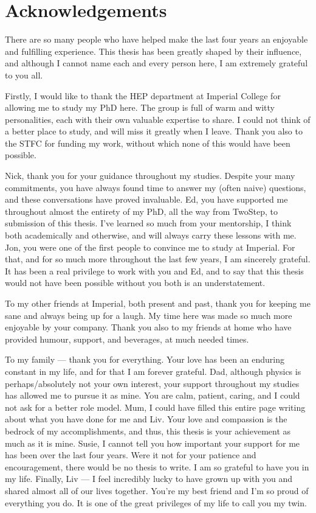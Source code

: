 \chapter*{\centering Acknowledgements}


There are so many people who have helped make the last four years an enjoyable and fulfilling experience. This thesis has been greatly shaped by their influence, and although I cannot name each and every person here, I am extremely grateful to you all.

Firstly, I would like to thank the HEP department at Imperial College for allowing me to study my PhD here. The group is full of warm and witty personalities, each with their own valuable expertise to share. I could not think of a better place to study, and will miss it greatly when I leave. Thank you also to the STFC for funding my work, without which none of this would have been possible.

Nick, thank you for your guidance throughout my studies. Despite your many commitments, you have always found time to answer my (often naive) questions, and these conversations have proved invaluable. 
Ed, you have supported me throughout almost the entirety of my PhD, all the way from TwoStep, to submission of this thesis. I've learned so much from your mentorship, I think both academically and otherwise, and will always carry these lessons with me. 
Jon, you were one of the first people to convince me to study at Imperial. For that, and for so much more throughout the last few years, I am sincerely grateful. It has been a real privilege to work with you and Ed, and to say that this thesis would not have been possible without you both is an understatement.

To my other friends at Imperial, both present and past, thank you for keeping me sane and always being up for a laugh. My time here was made so much more enjoyable by your company. Thank you also to my friends at home who have provided humour, support, and beverages, at much needed times.

To my family --- thank you for everything. Your love has been an enduring constant in my life, and for that I am forever grateful. Dad, although physics is perhaps/absolutely not your own interest, your support throughout my studies has allowed me to pursue it as mine. You are calm, patient, caring, and I could not ask for a better role model. Mum, I could have filled this entire page writing about what you have done for me and Liv. Your love and compassion is the bedrock of my accomplishments, and thus, this thesis is your achievement as much as it is mine. Susie, I cannot tell you how important your support for me has been over the last four years. Were it not for your patience and encouragement, there would be no thesis to write. I am so grateful to have you in my life. Finally, Liv --- I feel incredibly lucky to have grown up with you and shared almost all of our lives together. You're my best friend and I'm so proud of everything you do. It is one of the great privileges of my life to call you my twin. 

